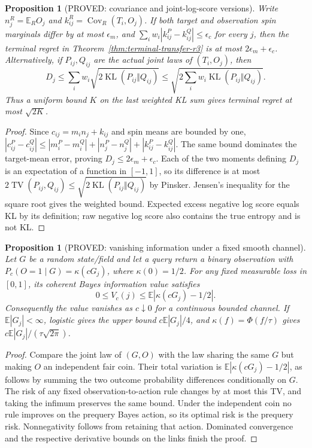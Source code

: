 \documentclass[11pt]{article}
\newtheorem{proposition}[theorem]{Proposition}
\theoremstyle{definition}
\theoremstyle{remark}
\begin{document}
\begin{proposition}[PROVED: covariance and joint-log-score versions]
\label{prop:cov-kl-r3}
Write $n_j^R=\mathbb E_R O_j$ and
$k_{ij}^R=\operatorname{Cov}_R(T_i,O_j)$. If both target and observation
spin marginals differ by at most $\epsilon_m$, and
$\sum_iw_i|k_{ij}^P-k_{ij}^Q|\le\epsilon_c$ for every $j$, then
the terminal regret in Theorem~\ref{thm:terminal-transfer-r3} is at most
$2\epsilon_m+\epsilon_c$.
Alternatively, if $P_{ij},Q_{ij}$ are the actual joint laws of
$(T_i,O_j)$, then
\[
 D_j\le\sum_iw_i\sqrt{2\operatorname{KL}(P_{ij}\Vert Q_{ij})}
 \le\sqrt{2\sum_iw_i\operatorname{KL}(P_{ij}\Vert Q_{ij})}.
\]
Thus a uniform bound $K$ on the last weighted KL sum gives terminal
regret at most $\sqrt{2K}$.
\end{proposition}
\begin{proof}
Since $c_{ij}=m_i n_j+k_{ij}$ and spin means are bounded by one,
$|c_{ij}^P-c_{ij}^Q|\le |m_i^P-m_i^Q|+|n_j^P-n_j^Q|
+|k_{ij}^P-k_{ij}^Q|$. The same bound dominates the target-mean
error, proving $D_j\le2\epsilon_m+\epsilon_c$.
Each of the two moments defining $D_j$ is an expectation of a
function in $[-1,1]$, so its difference is at most $2\operatorname{TV}
(P_{ij},Q_{ij})\le\sqrt{2\operatorname{KL}(P_{ij}\Vert Q_{ij})}$
by Pinsker. Jensen's inequality for the square root gives the weighted
bound. Expected excess negative log score equals KL by its definition;
raw negative log score also contains the true entropy and is not KL.
\end{proof}

\begin{proposition}[PROVED: vanishing information under a fixed smooth channel]
\label{prop:bounded-scale-r3}
Let $G$ be a random state/field and let a query return a binary observation
with $P_c(O=1\mid G)=\kappa(cG_j)$, where $\kappa(0)=1/2$.
For any fixed measurable loss in $[0,1]$, its coherent Bayes information
value satisfies
\[
 0\le V_c(j)\le\mathbb E|\kappa(cG_j)-1/2|.
\]
Consequently the value vanishes as $c\downarrow0$ for a continuous
bounded channel. If $\mathbb E|G_j|<\infty$, logistic gives the upper
bound $c\mathbb E|G_j|/4$, and $\kappa(f)=\Phi(f/\tau)$ gives
$c\mathbb E|G_j|/(\tau\sqrt{2\pi})$.
\end{proposition}
\begin{proof}
Compare the joint law of $(G,O)$ with the law sharing the same $G$
but making $O$ an independent fair coin. Their total variation is
$\mathbb E|\kappa(cG_j)-1/2|$, as follows by summing the two outcome
probability differences conditionally on $G$. The risk of any fixed
observation-to-action rule changes by at most this TV, and taking the
infimum preserves the same bound. Under the independent coin no rule
improves on the prequery Bayes action, so its optimal risk is the
prequery risk. Nonnegativity follows from retaining that action.
Dominated convergence and the respective derivative bounds on the
links finish the proof.
\end{proof}
\end{document}
